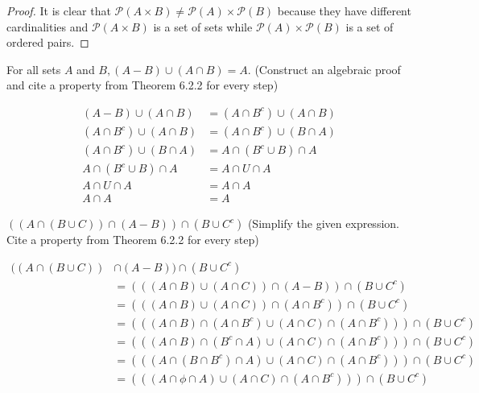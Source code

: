 \documentclass[12pt,letterpaper, onecolumn]{exam}
\begin{document}
\begin{questions}
\begin{solution}
\begin{proof}
			It is clear that $\mathscr{P}(A \times B)\neq\mathscr{P}(A)\times \mathscr{P}(B)$ because they have different cardinalities and $\mathscr{P}(A\times B)$ is a set of sets while $\mathscr{P}(A)\times\mathscr{P}(B)$ is a set of ordered pairs.
		\end{proof}
	\end{solution}
	\setcounter{question}{31}\question For all sets $A$ and $B, (A-B)\cup (A\cap B)=A.$ (Construct an algebraic proof and cite a property from Theorem 6.2.2 for every step)
	\begin{solution}
			\begin{align*}
			(A-B)\cup(A\cap B)&=(A\cap B^c)\cup(A\cap B)\tag{By the set difference law}\\
			(A\cap B^c)\cup(A\cap B)&=(A\cap B^c)\cup(B\cap A)\tag{By the commutative laws}\\
			(A\cap B^c)\cup(B\cap A)&=A\cap(B^c\cup B)\cap A\tag{By the associative laws}\\
			A\cap(B^c\cup B)\cap A&=A\cap U \cap A\tag{By the complement laws}\\
						A\cap U \cap A&=A\cap A\tag{By the identity laws}\\
						A\cap A&=A\tag{By the idempotent laws}
		\end{align*}
	\end{solution}
	\pagebreak
	\setcounter{question}{42}\question $((A\cap (B\cup C))\cap(A-B))\cap (B \cup C^c)$ (Simplify the given expression. Cite a property from
	Theorem 6.2.2 for every step)
	\begin{solution}
		\begin{align*}
			((A\cap (B\cup C))&\cap(A-B))\cap(B \cup C^c)\\
			&=(((A\cap B)\cup(A\cap C))\cap(A-B))\cap (B \cup C^c)\tag{By the distributive laws}\\
			&=(((A\cap B)\cup(A\cap C))\cap(A\cap B^c))\cap (B \cup C^c)\tag{By the set difference law}\\
			&=(((A\cap B)\cap(A\cap B^c)\cup(A\cap C)\cap(A\cap B^c)))\cap (B \cup C^c)\tag{By the distributive laws}\\
			&=(((A\cap B)\cap(B^c\cap A)\cup(A\cap C)\cap(A\cap B^c)))\cap (B \cup C^c)\tag{By the commutative laws}\\
			&=(((A\cap (B\cap B^c)\cap A)\cup(A\cap C)\cap(A\cap B^c)))\cap (B \cup C^c)\tag{By the associative laws}\\
			&=(((A\cap \phi\cap A)\cup(A\cap C)\cap(A\cap B^c)))\cap (B \cup C^c)\tag{By the complement laws}\\

\end{align*}
\end{solution}
\end{questions}
\end{document}
